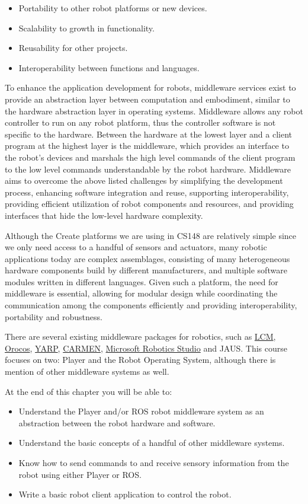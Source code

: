 \begin{itemize}
\item Portability to other robot platforms or new devices.
\item Scalability to growth in functionality.
\item Reusability for other projects.
\item Interoperability between functions and languages.
\end{itemize}

To enhance the application development for robots, middleware services exist to provide an abstraction layer between computation and embodiment, similar to the hardware abstraction layer in operating systems. Middleware allows any robot controller to run on any robot platform, thus the controller software is not specific to the hardware. Between the hardware at the lowest layer and a client program at the highest layer is the middleware, which provides an interface to the robot's devices and marshals the high level commands of the client program to the low level commands understandable by the robot hardware. Middleware aims to overcome the above listed challenges by simplifying the development process, enhancing software integration and reuse, supporting interoperability, providing efficient utilization of robot components and resources, and providing interfaces that hide the low-level hardware complexity.

Although the Create platforms we are using in CS148 are relatively simple since we only need access to a handful of sensors and actuators, many robotic applications today are complex assemblages, consisting of many heterogeneous hardware components build by different manufacturers, and multiple software modules written in different languages. Given such a platform, the need for middleware is essential, allowing for modular design while coordinating the communication among the components efficiently and providing interoperability, portability and robustness.

There are several existing middleware packages for robotics, such as \href{http://code.google.com/p/lcm/}{LCM}, \href{http://www.orocos.org/}{Orocos}, \href{http://eris.liralab.it/yarp/}{YARP}, \href{http://carmen.sourceforge.net/}{CARMEN}, \href{http://msdn.microsoft.com/en-us/robotics/default.aspx}{Microsoft Robotics Studio} and JAUS. This course focuses on two: Player and the Robot Operating System, although there is mention of other middleware systems as well.

At the end of this chapter you will be able to:
\begin{itemize}
\item Understand the Player and/or ROS robot middleware system as an abstraction between the robot hardware and software.
\item Understand the basic concepts of a handful of other middleware systems.
\item Know how to send commands to and receive sensory information from the robot using either Player or ROS.
\item Write a basic robot client application to control the robot.
\end{itemize}

